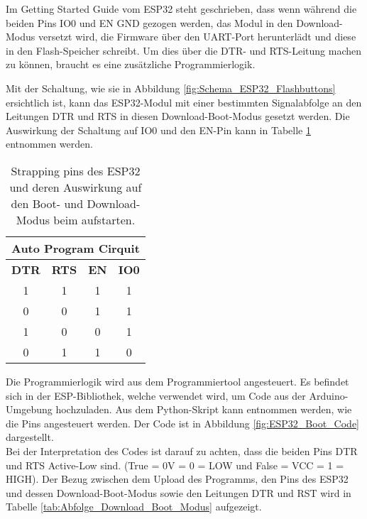 Im Getting Started Guide vom ESP32 steht geschrieben, dass wenn während die beiden Pins IO0 und EN GND gezogen werden, das Modul in den Download-Modus versetzt wird, die Firmware über den UART-Port herunterlädt und diese in den Flash-Speicher schreibt. Um dies über die DTR- und RTS-Leitung machen zu können, braucht es eine zusätzliche Programmierlogik.

Mit der Schaltung, wie sie in Abbildung \ref{fig:Schema_ESP32_Flashbuttons} ersichtlich ist, kann das ESP32-Modul mit einer bestimmten Signalabfolge an den Leitungen DTR und RTS in diesen Download-Boot-Modus gesetzt werden. Die Auswirkung der Schaltung auf IO0 und den EN-Pin kann in Tabelle \ref{tab:Einfluss_Boot_Schaltung} entnommen werden.

\begin{table}[H]
\center
\begin{tabular}{|c|c||c|c|}
\hline
\multicolumn{4}{|c|}{\textbf{Auto Program Cirquit}}\\
\hline
\textbf{DTR} & \textbf{RTS} & \textbf{EN} & \textbf{IO0} \\
\hline
1 & 1 & 1 & 1 \\
\hline
0 & 0 & 1 & 1 \\
\hline
1 & 0 & 0 & 1 \\
\hline
0 & 1 & 1 & 0 \\
\hline
\end{tabular}

\caption{Strapping pins des ESP32 und deren Auswirkung auf den Boot- und Download-Modus beim aufstarten.}
\label{tab:Einfluss_Boot_Schaltung}
\end{table}

Die Programmierlogik wird aus dem Programmiertool angesteuert. Es befindet sich in der ESP-Bibliothek, welche verwendet wird, um Code aus der Arduino-Umgebung hochzuladen. Aus dem Python-Skript kann entnommen werden, wie die Pins angesteuert werden. Der Code ist in Abbildung \ref{fig:ESP32_Boot_Code} dargestellt.\\
Bei der Interpretation des Codes ist darauf zu achten, dass die beiden Pins DTR und RTS Active-Low sind. (True = 0V = 0 = LOW und False = VCC = 1 = HIGH). Der Bezug zwischen dem Upload des Programms, den Pins des ESP32 und dessen Download-Boot-Modus sowie den Leitungen DTR und RST wird in Tabelle \ref{tab:Abfolge_Download_Boot_Modus} aufgezeigt.
